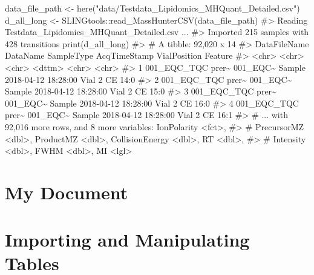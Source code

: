 \documentclass[
  letterpaper,
  DIV=11,
  numbers=noendperiod]{scrreprt}
\newenvironment{Shaded}{\begin{snugshade}}{\end{snugshade}}
\newcommand{\CommentTok}[1]{\textcolor[rgb]{0.37,0.37,0.37}{#1}}
\newcommand{\FunctionTok}[1]{\textcolor[rgb]{0.28,0.35,0.67}{#1}}
\newcommand{\NormalTok}[1]{\textcolor[rgb]{0.00,0.23,0.31}{#1}}
\newcommand{\OtherTok}[1]{\textcolor[rgb]{0.00,0.23,0.31}{#1}}
\newcommand{\SpecialCharTok}[1]{\textcolor[rgb]{0.37,0.37,0.37}{#1}}
\newcommand{\StringTok}[1]{\textcolor[rgb]{0.13,0.47,0.30}{#1}}
\begin{document}
\begin{Shaded}
\begin{Highlighting}[]
\NormalTok{data\_file\_path }\OtherTok{\textless{}{-}} \FunctionTok{here}\NormalTok{(}\StringTok{"data/Testdata\_Lipidomics\_MHQuant\_Detailed.csv"}\NormalTok{)}
\NormalTok{d\_all\_long }\OtherTok{\textless{}{-}}\NormalTok{ SLINGtools}\SpecialCharTok{::}\FunctionTok{read\_MassHunterCSV}\NormalTok{(data\_file\_path)}
\CommentTok{\#\textgreater{} Reading \textquotesingle{}Testdata\_Lipidomics\_MHQuant\_Detailed.csv\textquotesingle{} ... }
\CommentTok{\#\textgreater{} Imported  215 samples with 428 transitions}
\FunctionTok{print}\NormalTok{(d\_all\_long)}
\CommentTok{\#\textgreater{} \# A tibble: 92,020 x 14}
\CommentTok{\#\textgreater{}   DataFileName      DataName SampleType AcqTimeStamp        VialPosition Feature}
\CommentTok{\#\textgreater{}   \textless{}chr\textgreater{}             \textless{}chr\textgreater{}    \textless{}chr\textgreater{}      \textless{}dttm\textgreater{}              \textless{}chr\textgreater{}        \textless{}chr\textgreater{}  }
\CommentTok{\#\textgreater{} 1 001\_EQC\_TQC prer\textasciitilde{} 001\_EQC\textasciitilde{} Sample     2018{-}04{-}12 18:28:00 Vial 2       CE 14:0}
\CommentTok{\#\textgreater{} 2 001\_EQC\_TQC prer\textasciitilde{} 001\_EQC\textasciitilde{} Sample     2018{-}04{-}12 18:28:00 Vial 2       CE 15:0}
\CommentTok{\#\textgreater{} 3 001\_EQC\_TQC prer\textasciitilde{} 001\_EQC\textasciitilde{} Sample     2018{-}04{-}12 18:28:00 Vial 2       CE 16:0}
\CommentTok{\#\textgreater{} 4 001\_EQC\_TQC prer\textasciitilde{} 001\_EQC\textasciitilde{} Sample     2018{-}04{-}12 18:28:00 Vial 2       CE 16:1}
\CommentTok{\#\textgreater{} \# ... with 92,016 more rows, and 8 more variables: IonPolarity \textless{}fct\textgreater{},}
\CommentTok{\#\textgreater{} \#   PrecursorMZ \textless{}dbl\textgreater{}, ProductMZ \textless{}dbl\textgreater{}, CollisionEnergy \textless{}dbl\textgreater{}, RT \textless{}dbl\textgreater{},}
\CommentTok{\#\textgreater{} \#   Intensity \textless{}dbl\textgreater{}, FWHM \textless{}dbl\textgreater{}, MI \textless{}lgl\textgreater{}}
\end{Highlighting}
\end{Shaded}

\hypertarget{my-document}{%
\chapter{My Document}\label{my-document}}

\hypertarget{importing-and-manipulating-tables}{%
\chapter{Importing and Manipulating
Tables}\label{importing-and-manipulating-tables}}
\end{document}
